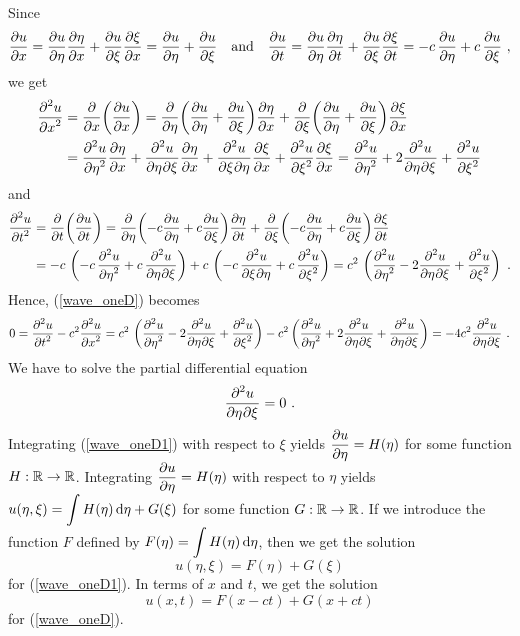 Since
\[
\pdydx{u}{x} = \pdydx{u}{\eta}\pdydx{\eta}{x} + \pdydx{u}{\xi}\pdydx{\xi}{x}
= \pdydx{u}{\eta} + \pdydx{u}{\xi}
\quad \text{and} \quad
\pdydx{u}{t} = \pdydx{u}{\eta}\pdydx{\eta}{t} + \pdydx{u}{\xi}\pdydx{\xi}{t}
= -c\, \pdydx{u}{\eta} +c\, \pdydx{u}{\xi} \ ,
\]
we get
\begin{align*}
\pdydxn{u}{x}{2} &= \pdfdx{\left(\pdydx{u}{x}\right)}{x}
= \pdfdx{\left(\pdydx{u}{\eta} + \pdydx{u}{\xi}\right)}{\eta} \pdydx{\eta}{x}
+ \pdfdx{\left(\pdydx{u}{\eta} + \pdydx{u}{\xi}\right)}{\xi} \pdydx{\xi}{x}\\
&= \pdydxn{u}{\eta}{2}\pdydx{\eta}{x} +
\pdydxnm{u}{\eta}{\xi}{2}{}{}\pdydx{\eta}{x} +
\pdydxnm{u}{\xi}{\eta}{2}{}{}\pdydx{\xi}{x} +
\pdydxn{u}{\xi}{2}\pdydx{\xi}{x}
= \pdydxn{u}{\eta}{2} + 2\pdydxnm{u}{\eta}{\xi}{2}{}{} +
\pdydxn{u}{\xi}{2}
\end{align*}
and
\begin{align*}
\pdydxn{u}{t}{2} &= \pdfdx{\left(\pdydx{u}{t}\right)}{t}
= \pdfdx{\left(-c\pdydx{u}{\eta} + c\pdydx{u}{\xi}\right)}{\eta}\pdydx{\eta}{t}
+ \pdfdx{\left(-c\pdydx{u}{\eta} + c\pdydx{u}{\xi}\right)}{\xi}\pdydx{\xi}{t}\\
&= -c\,\left( -c\, \pdydxn{u}{\eta}{2}
   + c\,\pdydxnm{u}{\eta}{\xi}{2}{}{}\right) +
c\, \left( -c \,\pdydxnm{u}{\xi}{\eta}{2}{}{} + c\,\pdydxn{u}{\xi}{2} 
\right)
= c^2\,\left(\pdydxn{u}{\eta}{2} - 2\pdydxnm{u}{\eta}{\xi}{2}{}{}
+ \pdydxn{u}{\xi}{2} \right) \ .
\end{align*}
Hence, (\ref{wave_oneD}) becomes
\[
0 = \pdydxn{u}{t}{2} - c^2 \pdydxn{u}{x}{2} =
c^2\,\left(\pdydxn{u}{\eta}{2} - 2\pdydxnm{u}{\eta}{\xi}{2}{}{}
+ \pdydxn{u}{\xi}{2} \right) - c^2 \left(
\pdydxn{u}{\eta}{2} + 2\pdydxnm{u}{\eta}{\xi}{2}{}{} +
\pdydxnm{u}{\eta}{\xi}{2}{}{} \right)
= -4c^2 \pdydxnm{u}{\eta}{\xi}{2}{}{} \ .
\]
We have to solve the partial differential equation
\begin{equation} \label{wave_oneD1}
\pdydxnm{u}{\eta}{\xi}{2}{}{} = 0 \ .
\end{equation}
Integrating (\ref{wave_oneD1}) with
respect to $\xi$ yields $\DS \pdydx{u}{\eta} = H(\eta)$ for
some function $H:\RR\rightarrow \RR$.  Integrating
$\DS \pdydx{u}{\eta} = H(\eta)$ with respect to $\eta$ yields
$\DS u(\eta,\xi) = \int H(\eta) \dx{\eta} + G(\xi)$ for some
function $G:\RR\rightarrow \RR$.  If we introduce the function $F$
defined by
$\DS F(\eta) = \int H(\eta) \dx{\eta}$, then we get the solution
\[
u(\eta,\xi) = F(\eta) + G(\xi)
\]
for (\ref{wave_oneD1}).  In terms of $x$ and $t$, we get the solution
\begin{equation} \label{wave_oneD1uFG}
u(x,t) = F(x-ct) + G(x+ct)
\end{equation}
for (\ref{wave_oneD}).

